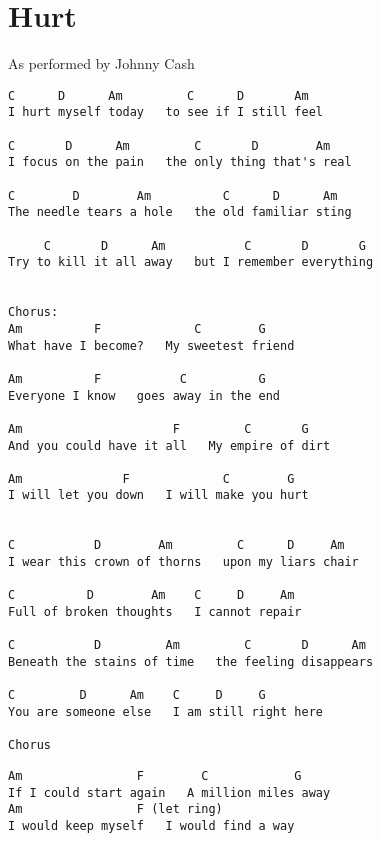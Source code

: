 \documentclass[leqno]{memoir}
\begin{document}
\chapter{Hurt}
As performed by Johnny Cash
\begin{verbatim}
C      D      Am         C      D       Am
I hurt myself today   to see if I still feel

C       D      Am         C       D        Am
I focus on the pain   the only thing that's real

C        D        Am          C      D      Am
The needle tears a hole   the old familiar sting

     C       D      Am           C       D       G          
Try to kill it all away   but I remember everything


Chorus:
Am          F             C        G
What have I become?   My sweetest friend

Am          F           C          G
Everyone I know   goes away in the end

Am                     F         C       G
And you could have it all   My empire of dirt

Am              F             C        G
I will let you down   I will make you hurt


C           D        Am         C      D     Am
I wear this crown of thorns   upon my liars chair

C          D        Am    C     D     Am
Full of broken thoughts   I cannot repair

C           D         Am         C       D      Am
Beneath the stains of time   the feeling disappears

C         D      Am    C     D     G
You are someone else   I am still right here

Chorus
\end{verbatim}
\newpage
\begin{verbatim}
Am                F        C            G
If I could start again   A million miles away
Am                F (let ring)        
I would keep myself   I would find a way

\end{verbatim}
\newpage
\end{document}
